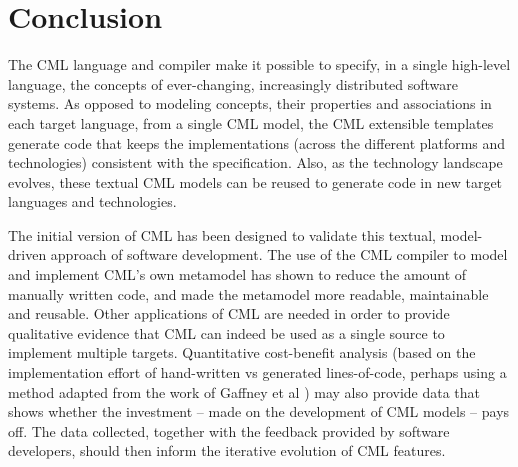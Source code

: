 \section{Conclusion}\label{sec:conclusion}

The CML language and compiler make it possible to specify,
in a single high-level language,
the concepts of ever-changing, increasingly distributed software systems.
As opposed to modeling concepts, their properties and associations in each target language,
from a single CML model,
the CML extensible templates generate code that keeps the implementations
(across the different platforms and technologies)
consistent with the specification.
Also, as the technology landscape evolves,
these textual CML models can be reused to generate code in new target languages and technologies.

The initial version of CML has been designed to validate this textual, model-driven approach of software development.
The use of the CML compiler to model and implement CML's own metamodel
has shown to reduce the amount of manually written code,
and made the metamodel more readable, maintainable and reusable.
Other applications of CML are needed in order to provide qualitative evidence that
CML can indeed be used as a single source to implement multiple targets.
Quantitative cost-benefit analysis
(based on the implementation effort of hand-written vs generated lines-of-code,
perhaps using a method adapted from the work of Gaffney et al \cite{gaffney})
may also provide data
that shows whether the investment -- made on the development of CML models -- pays off.
The data collected, together with the feedback provided by software developers,
should then inform the iterative evolution of CML features.

